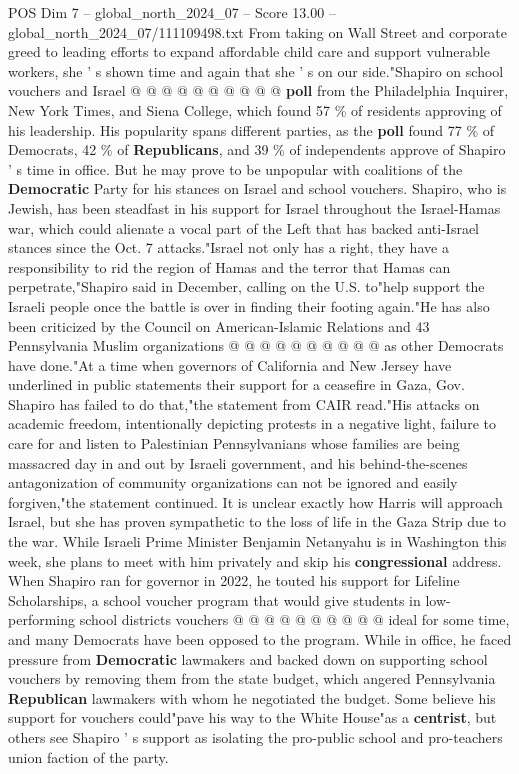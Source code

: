 \begin{textsample}{POS Dim 7 – global\_north\_2024\_07 – Score 13.00 – global\_north\_2024\_07/111109498.txt}
From taking on Wall Street and corporate greed to leading efforts to expand affordable child care and support vulnerable workers, she ' s shown time and again that she ' s on our side."Shapiro on school vouchers and Israel @ @ @ @ @ @ @ @ @ @ \textbf{poll} from the Philadelphia Inquirer, New York Times, and Siena College, which found 57 \% of residents approving of his leadership.
His popularity spans different parties, as the \textbf{poll} found 77 \% of Democrats, 42 \% of \textbf{Republicans}, and 39 \% of independents approve of Shapiro ' s time in office.
But he may prove to be unpopular with coalitions of the \textbf{Democratic} Party for his stances on Israel and school vouchers.
Shapiro, who is Jewish, has been steadfast in his support for Israel throughout the Israel-Hamas war, which could alienate a vocal part of the Left that has backed anti-Israel stances since the Oct. 7 attacks."Israel not only has a right, they have a responsibility to rid the region of Hamas and the terror that Hamas can perpetrate,"Shapiro said in December, calling on the U.S. to"help support the Israeli people once the battle is over in finding their footing again."He has also been criticized by the Council on American-Islamic Relations and 43 Pennsylvania Muslim organizations @ @ @ @ @ @ @ @ @ @ as other Democrats have done."At a time when governors of California and New Jersey have underlined in public statements their support for a ceasefire in Gaza, Gov.
Shapiro has failed to do that,"the statement from CAIR read."His attacks on academic freedom, intentionally depicting protests in a negative light, failure to care for and listen to Palestinian Pennsylvanians whose families are being massacred day in and out by Israeli government, and his behind-the-scenes antagonization of community organizations can not be ignored and easily forgiven,"the statement continued.
It is unclear exactly how Harris will approach Israel, but she has proven sympathetic to the loss of life in the Gaza Strip due to the war.
While Israeli Prime Minister Benjamin Netanyahu is in Washington this week, she plans to meet with him privately and skip his \textbf{congressional} address.
When Shapiro ran for governor in 2022, he touted his support for Lifeline Scholarships, a school voucher program that would give students in low-performing school districts vouchers @ @ @ @ @ @ @ @ @ @ ideal for some time, and many Democrats have been opposed to the program.
While in office, he faced pressure from \textbf{Democratic} lawmakers and backed down on supporting school vouchers by removing them from the state budget, which angered Pennsylvania \textbf{Republican} lawmakers with whom he negotiated the budget.
Some believe his support for vouchers could"pave his way to the White House"as a \textbf{centrist}, but others see Shapiro ' s support as isolating the pro-public school and pro-teachers union faction of the party.

\end{textsample}
